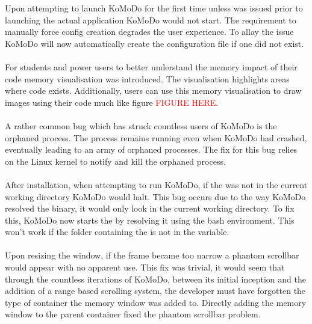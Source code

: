   Upon attempting to launch KoMoDo for the first time unless  was issued prior to launching the actual application KoMoDo would not start. The requirement to manually force config creation degrades the user experience. To allay the issue KoMoDo will now automatically create the configuration file if one did not exist.\\\\
  For students and power users to better understand the memory impact of their code memory visualisation was introduced. The visualisation highlights areas where code exists. Additionally, users can use this memory visualisation to draw images using their code much like figure \textcolor{red}{FIGURE HERE}.\\\\
  A rather common bug which has struck countless users of KoMoDo is the orphaned  process. The process remains running even when KoMoDo had crashed, eventually leading to an army of orphaned processes. The fix for this bug relies on the Linux kernel to notify and kill the orphaned process.\\\\
  After installation, when attempting to run KoMoDo, if the  was not in the current working directory KoMoDo would halt. This bug occurs due to the way KoMoDo resolved the  binary, it would only look in the current working directory. To fix this, KoMoDo now starts the  by resolving it using the bash environment. This won't work if the folder containing the  is not in the  variable.\\\\
  Upon resizing the window, if the frame became too narrow a phantom scrollbar would appear with no apparent use. This fix was trivial, it would seem that through the countless iterations of KoMoDo, between its initial inception and the addition of a range based scrolling system, the developer must have forgotten the type of container the memory window was added to. Directly adding the memory window to the parent container fixed the phantom scrollbar problem.\\\\
